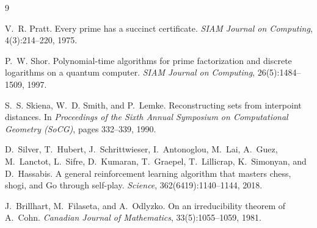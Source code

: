 \documentclass[11pt]{article}
\theoremstyle{definition}
\theoremstyle{plain}
\theoremstyle{remark}
\begin{document}
\begin{thebibliography}{9}

V.~R. Pratt.
\newblock Every prime has a succinct certificate.
\newblock \emph{SIAM Journal on Computing}, 4(3):214--220, 1975.

P.~W. Shor.
\newblock Polynomial-time algorithms for prime factorization and discrete logarithms on a
quantum computer.
\newblock \emph{SIAM Journal on Computing}, 26(5):1484--1509, 1997.

S.~S. Skiena, W.~D. Smith, and P.~Lemke.
\newblock Reconstructing sets from interpoint distances.
\newblock In \emph{Proceedings of the Sixth Annual Symposium on Computational Geometry
(SoCG)}, pages 332--339, 1990.

D.~Silver, T.~Hubert, J.~Schrittwieser, I.~Antonoglou, M.~Lai, A.~Guez, M.~Lanctot, L.~Sifre,
D.~Kumaran, T.~Graepel, T.~Lillicrap, K.~Simonyan, and D.~Hassabis.
\newblock A general reinforcement learning algorithm that masters chess, shogi, and Go
through self-play.
\newblock \emph{Science}, 362(6419):1140--1144, 2018.

J.~Brillhart, M.~Filaseta, and A.~Odlyzko.
\newblock On an irreducibility theorem of A.~Cohn.
\newblock \emph{Canadian Journal of Mathematics}, 33(5):1055--1059, 1981.

\end{thebibliography}
\end{document}

